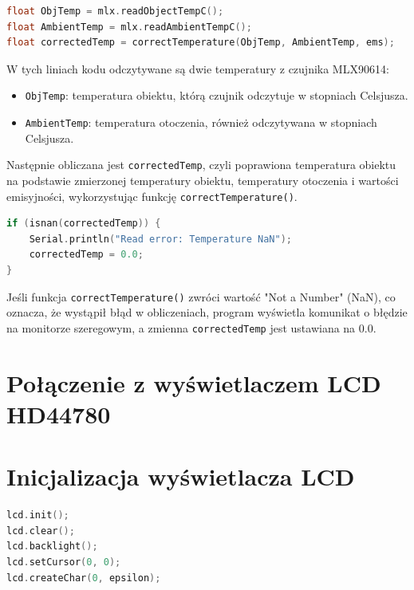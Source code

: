 \begin{lstlisting}[language=C++]
float ObjTemp = mlx.readObjectTempC();
float AmbientTemp = mlx.readAmbientTempC();
float correctedTemp = correctTemperature(ObjTemp, AmbientTemp, ems);
\end{lstlisting}

W tych liniach kodu odczytywane są dwie temperatury z czujnika MLX90614:
\begin{itemize}
    \item \texttt{ObjTemp}: temperatura obiektu, którą czujnik odczytuje w stopniach Celsjusza.
    \item \texttt{AmbientTemp}: temperatura otoczenia, również odczytywana w stopniach Celsjusza.
\end{itemize}

Następnie obliczana jest \texttt{correctedTemp}, czyli poprawiona temperatura obiektu na podstawie zmierzonej temperatury obiektu, temperatury otoczenia i wartości emisyjności, wykorzystując funkcję \texttt{correctTemperature()}.

\begin{lstlisting}[language=C++]
if (isnan(correctedTemp)) {
    Serial.println("Read error: Temperature NaN");
    correctedTemp = 0.0;
}
\end{lstlisting}

Jeśli funkcja \texttt{correctTemperature()} zwróci wartość "Not a Number" (NaN), co oznacza, że wystąpił błąd w obliczeniach, program wyświetla komunikat o błędzie na monitorze szeregowym, a zmienna \texttt{correctedTemp} jest ustawiana na 0.0.


\section{Połączenie z wyświetlaczem LCD HD44780}


\section*{Inicjalizacja wyświetlacza LCD}

\begin{lstlisting}[language=C++]
lcd.init();
lcd.clear();
lcd.backlight();
lcd.setCursor(0, 0);
lcd.createChar(0, epsilon);
\end{lstlisting}

